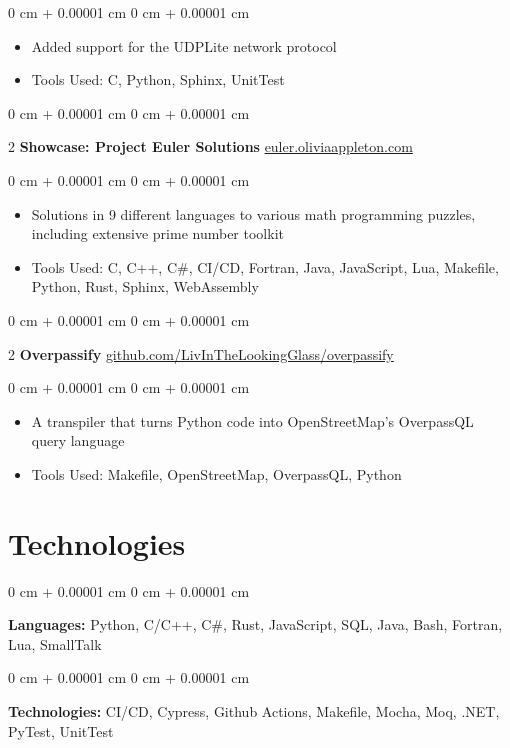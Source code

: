\documentclass[10pt, letterpaper]{article}
\newenvironment{highlights}{ \begin{itemize}[ topsep=\subsectiongap, parsep=\subsectiongap, partopsep=0pt,
itemsep=0pt, leftmargin=0 cm + 10pt ] }{ \end{itemize} } %
\newenvironment{onecolentry}{ \begin{adjustwidth}{ 0 cm + 0.00001 cm }{ 0 cm + 0.00001 cm }
}{ \end{adjustwidth} } %
\newenvironment{twocolentry}[2][]{ \onecolentry \def\secondColumn{#2} \setcolumnwidth{\fill, 4.5 cm}
\begin{paracol}{2} }{ \switchcolumn \raggedleft \secondColumn  \end{paracol}
\endonecolentry } %
\newcommand{\sectionoffset}{-0.12 cm}
\newcommand{\ssubsectiongap}{ 0.0953}
\newcommand{\ssubsectiongapd}{\fpeval{2 * \ssubsectiongap}}
\newcommand{\subsectiongap}{\ssubsectiongap cm}
\newcommand{\subsectiongapd}{\ssubsectiongapd cm}
\begin{document}
	\begin{onecolentry}
		\begin{highlights}
			\item Added support for the UDPLite network protocol
			\item Tools Used: C, Python, Sphinx, UnitTest
		\end{highlights}
	\end{onecolentry}

	\vspace{\subsectiongapd}

	\begin{twocolentry}
		{ \href{https://euler.oliviaappleton.com}{euler.oliviaappleton.com} } \textbf{Showcase:
		Project Euler Solutions}
	\end{twocolentry}

	\begin{onecolentry}
		\begin{highlights}
			\item Solutions in 9 different languages to various math programming puzzles, including extensive prime number toolkit
			\item Tools Used: C, C+\!+, C\#, CI/CD, Fortran, Java, JavaScript, Lua,
			Makefile, Python, Rust, Sphinx, WebAssembly
		\end{highlights}
	\end{onecolentry}

	\vspace{\subsectiongapd}

	\begin{twocolentry}
		{ \hspace{-3 cm} \href{https://github.com/LivInTheLookingGlass/overpassify}{ \mbox{github.com/LivInTheLookingGlass/overpassify}} } \textbf{Overpassify}
	\end{twocolentry}

	\begin{onecolentry}
		\begin{highlights}
			\item A transpiler that turns Python code into OpenStreetMap's OverpassQL query language
			\item Tools Used: Makefile, OpenStreetMap, OverpassQL, Python
		\end{highlights}
	\end{onecolentry}

	\vspace{\sectionoffset}

	\section{Technologies}

	\begin{onecolentry}
		\textbf{Languages:} Python, C/C+\!+, C\#, Rust, JavaScript, SQL, Java, Bash,
		Fortran, Lua, SmallTalk
	\end{onecolentry}

	\begin{onecolentry}
		\textbf{Technologies:} CI/CD, Cypress, Github Actions, Makefile, Mocha, Moq, .NET, PyTest, UnitTest
	\end{onecolentry}
\end{document}
